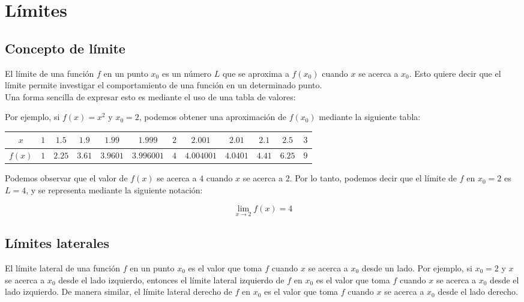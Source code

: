 \chapter{Límites}

\section{Concepto de límite}

El límite de una función $f$ 
en un punto $x_0$ es un número $L$ que se aproxima a 
$f(x_0)$ cuando $x$ se acerca a $x_0$. Esto quiere decir 
que el límite permite investigar el comportamiento de una 
función en un determinado punto. \\

Una forma sencilla de expresar esto es mediante el uso de una 
tabla de valores:

\ex{} {
    Por ejemplo, si $f(x) = x^2$ y $x_0 = 2$, 
    podemos obtener una aproximación de $f(x_0)$ mediante la 
    siguiente tabla:

    \begin{center}
        \begin{tabular}{c|c|c|c|c|c|c|c|c|c|c|c}
            $x$ & $1$ & $1.5$ & $1.9$ & $1.99$ & $1.999$ & $2$ & $2.001$ & $2.01$ & $2.1$ & $2.5$ & $3$ \\
            \hline
            $f(x)$ & $1$ & $2.25$ & $3.61$ & $3.9601$ & $3.996001$ & $4$ & $4.004001$ & $4.0401$ & $4.41$ & $6.25$ & $9$ \\
        \end{tabular}
    \end{center}


    Podemos observar que el valor de $f(x)$ se acerca a $4$
    cuando $x$ se acerca a $2$. Por lo tanto, podemos decir
    que el límite de $f$ en $x_0 = 2$ es $L = 4$, y se 
    representa mediante la siguiente notación:

    \[
        \lim_{x \to 2} f(x) = 4
    \]
}

\section{Límites laterales}

El límite lateral de una función $f$ en un punto $x_0$ es el 
valor que toma $f$ cuando $x$ se acerca a $x_0$ desde un 
lado. Por ejemplo, si $x_0 = 2$ y $x$ se acerca a $x_0$ desde 
el lado izquierdo, entonces el límite lateral izquierdo de 
$f$ en $x_0$ es el valor que toma $f$ cuando $x$ se acerca a 
$x_0$ desde el lado izquierdo. De manera similar, el límite 
lateral derecho de $f$ en $x_0$ es el valor que toma $f$ 
cuando $x$ se acerca a $x_0$ desde el lado derecho. \\

